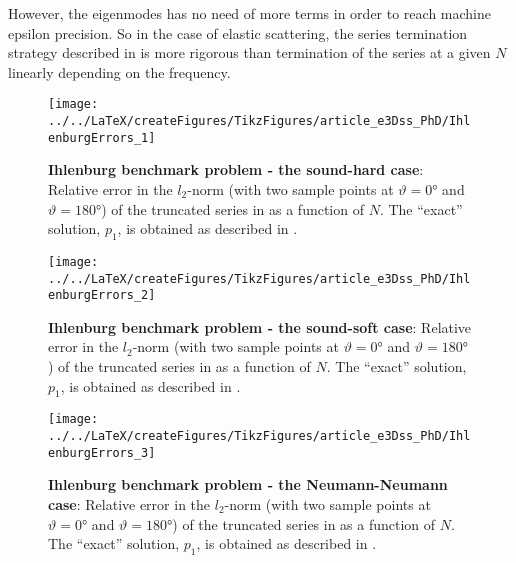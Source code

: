 However, the eigenmodes has no need of more terms in order to reach machine epsilon precision. So in the case of elastic scattering, the series termination strategy described in  is more rigorous than termination of the series at a given $N$ linearly depending on the frequency.
\begin{figure}
	\centering
	\texttt{[image: ../../LaTeX/createFigures/TikzFigures/article\_e3Dss\_PhD/IhlenburgErrors\_1]}
		\caption{\textbf{Ihlenburg benchmark problem - the sound-hard case}: Relative error in the $l_2$-norm (with two sample points at $\vartheta = \ang{0}$ and $\vartheta = \ang{180}$) of the truncated series in  as a function of $N$. The ``exact'' solution, $p_1$, is obtained as described in .}
	\label{Fig1:IhlenburgErrors1}
\end{figure}
\begin{figure}
	\centering
	\texttt{[image: ../../LaTeX/createFigures/TikzFigures/article\_e3Dss\_PhD/IhlenburgErrors\_2]}
		\caption{\textbf{Ihlenburg benchmark problem - the sound-soft case}: Relative error in the $l_2$-norm (with two sample points at $\vartheta = \ang{0}$ and $\vartheta = \ang{180}$) of the truncated series in  as a function of $N$. The ``exact'' solution, $p_1$, is obtained as described in .}
	\label{Fig1:IhlenburgErrors2}
\end{figure}
\begin{figure}
	\centering
	\texttt{[image: ../../LaTeX/createFigures/TikzFigures/article\_e3Dss\_PhD/IhlenburgErrors\_3]}
		\caption{\textbf{Ihlenburg benchmark problem - the Neumann-Neumann case}: Relative error in the $l_2$-norm (with two sample points at $\vartheta = \ang{0}$ and $\vartheta = \ang{180}$) of the truncated series in  as a function of $N$. The ``exact'' solution, $p_1$, is obtained as described in .}
	\label{Fig1:IhlenburgErrors3}
\end{figure}

